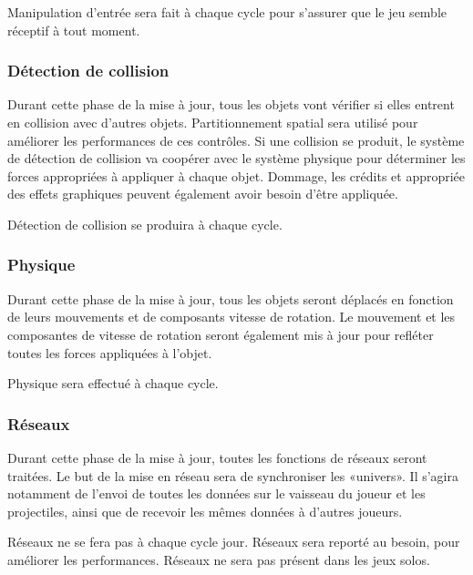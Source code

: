 Manipulation d'entrée sera fait à chaque cycle  pour s'assurer que le jeu semble réceptif à tout moment.


\subsubsection{Détection de collision} %
\label{ssub:détection_de_collision}

Durant cette phase de la mise à jour, tous les objets vont vérifier si elles entrent en collision avec d'autres objets. Partitionnement spatial sera utilisé pour améliorer les performances de ces contrôles. Si une collision se produit, le système de détection de collision va coopérer avec le système physique pour déterminer les forces appropriées à appliquer à chaque objet. Dommage, les crédits et appropriée des effets graphiques peuvent également avoir besoin d'être appliquée. 

Détection de collision se produira à chaque cycle.


\subsubsection{Physique} %
\label{ssub:physique}

Durant cette phase de la mise à jour, tous les objets seront déplacés en fonction de leurs mouvements et de composants vitesse de rotation. Le mouvement et les composantes de vitesse de rotation seront également mis à jour pour refléter toutes les forces appliquées à l'objet. 

Physique sera effectué à chaque cycle.


\subsubsection{Réseaux} %
\label{ssub:réseau}

Durant cette phase de la mise à jour, toutes les fonctions de réseaux seront traitées. Le but de la mise en réseau sera de synchroniser les «univers». Il s'agira notamment de l'envoi de toutes les données sur le vaisseau du joueur et les projectiles, ainsi que de recevoir les mêmes données à d'autres joueurs. 

Réseaux ne se fera pas à chaque cycle jour. Réseaux sera reporté au besoin, pour améliorer les performances. Réseaux ne sera pas présent dans les jeux solos.

